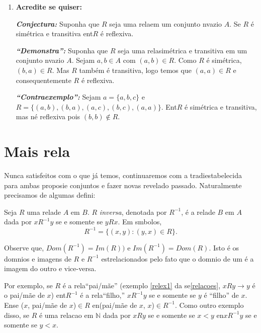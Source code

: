 \begin{enumerate}[{\bf 1.}]
\noindent \textit{\textbf{``Demonstra\caoi'':}} Seja $R$ uma rela\cao em um conjunto n\ao vazio $A$. Suponha $a,b\in A$ com $(a,b)\in R$. Como $R$ n\ao \'e sim\'etrica, $(b,a)\notin R$ logo $R$ \'e assim\'etrica.

\noindent \textit{\textbf{``Contraexemplo'':}} Sejam $A=\{1,2,3\}$ e $R=\{(1,2),(2,1),(1,3)\}$. Ent\ao $R$ n\ao \'e sim\'etrica nem assim\'etrica.

\item {\bf Acredite se quiser:}  

\noindent \textit{\textbf{Conjectura:}} Suponha que $R$ seja uma rela\cao em um conjunto n\ao vazio $A$. Se $R$ \'e sim\'etrica e transitiva ent\ao $R$ \'e reflexiva. 

\noindent \textit{\textbf{``Demonstra\caoi'':}} Suponha que $R$ seja uma rela\cao sim\'etrica e transitiva em um conjunto n\ao vazio $A$. Sejam $a,b\in A$ com $(a,b)\in R$. Como $R$ \'e sim\'etrica, $(b,a)\in R$. Mas $R$ tamb\'em \'e transitiva, logo temos que $(a,a)\in R$ e consequentemente $R$ \'e reflexiva.

\noindent \textit{\textbf{``Contraexemplo'':}} Sejam $a=\{a,b,c\}$ e $R=\{(a,b), (b,a), (a,c), (b,c), (a,a)\}$. Ent\ao $R$ \'e sim\'etrica e transitiva, mas n\ao \'e reflexiva pois $(b,b)\notin R$.
\end{enumerate}

\section{Mais rela\coes}\label{mrelacoes}

Nunca satisfeitos com o que j\'a temos, continuaremos com a tradi\cao estabelecida para ambas proposi\coes e conjuntos e fazer novas revela\coes do passado. Naturalmente precisamos de algumas defini\cois:
\begin{definb}
Seja $R$ uma rela\cao de $A$ em $B$. $R$ {\it inversa}, denotada por $R^{-1}$, \'e a rela\cao de $B$ em $A$ dada por $xR^{-1}y$ se e somente se $yRx$. Em s\ih mbolos,
\[
R^{-1}=\{(x,y):(y,x)\in R\}.
\]
\end{definb}

Observe que, $Dom(R^{-1})=Im(R))$ e $Im(R^{-1})=Dom(R)$. Isto \'e os dom\ih nios e imagens de $R$ e $R^{-1}$ est\ao relacionados pelo fato que o dom\ih nio de um \'e a imagem do outro e vice-versa.

Por exemplo, se $R$ \'e a rela\cao ``pai/m\~ae'' (exemplo \ref{relex1} da se\cao \ref{relacoes}, $xRy\to y$ \'e o pai/m\~ae de $x$) ent\ao $R^{-1}$ \'e a rela\cao ``filho,'' $xR^{-1}y$ se e somente se $y$ \'e ``filho'' de $x$. En\tao se ($x$, pai/m\~ae de $x$)$\in R$ en\tao (pai/m\~ae de $x$, $x$)$\in R^{-1}$. Como outro exemplo disso, se $R$ \'e uma relacao em $\mathbb{N}$ dada por $xRy$ se e somente se $x<y$ en\tao $xR^{-1}y$ se e somente se $y<x$.  


